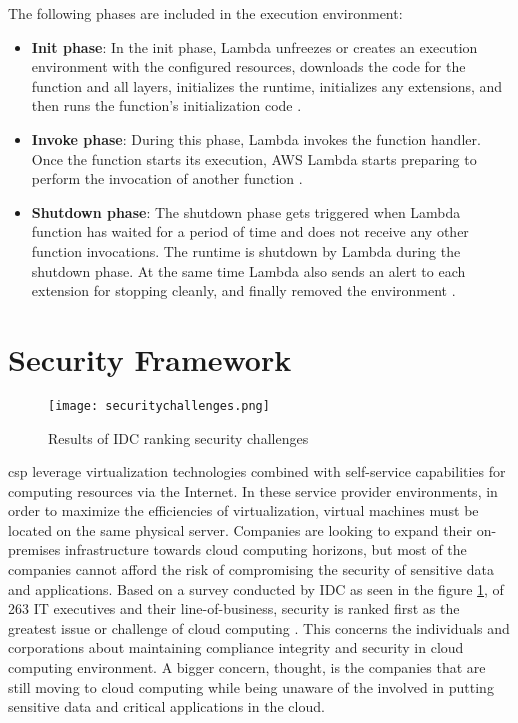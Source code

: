\par The following phases are included in the execution
environment:
\begin{itemize}
    \item \textbf{Init phase}: In the init phase, Lambda unfreezes or creates an execution environment with the configured
    resources, downloads the code for the function and all layers, initializes the runtime, initializes any
    extensions, and then runs the function’s
    initialization code \cite{46}.
\end{itemize}
\begin{itemize}
    \item \textbf{Invoke phase}: During this phase, Lambda invokes the function handler.
    Once the function starts its execution, AWS Lambda
    starts
    preparing to perform the invocation of another
    function \cite{46}.
\end{itemize}
\begin{itemize}
    \item \textbf{Shutdown phase}: The shutdown phase gets
    triggered when Lambda function has waited for a
    period of time and does not receive any
    other function invocations.
    The runtime is shutdown
    by Lambda during the shutdown phase. At the same time
    Lambda also sends an alert to
    each extension for
    stopping cleanly, and finally removed the environment \cite{46}.
\end{itemize}


\section{Security Framework}

\begin{figure}
    \centering
    \texttt{[image: securitychallenges.png]}
    \caption{Results of IDC ranking security
    challenges}{\cite{47}}
    \label{fig:securitychallenges}
\end{figure}

\par \gls{csp} leverage virtualization technologies combined with self-service capabilities for computing resources via the Internet.
In these service provider environments, in order to maximize the efficiencies of virtualization, virtual machines must be located on the same physical server.
Companies are looking to expand their on-premises
infrastructure towards cloud computing horizons, but most
of the companies cannot afford the risk of compromising the
security of sensitive data and applications.
Based on a survey conducted by IDC as seen in the figure \ref{fig:securitychallenges}, of 263 IT executives and their line-of-business, security is ranked first as the greatest issue or challenge of cloud computing \cite{47}.
This concerns the individuals and corporations about maintaining compliance integrity and security in cloud computing environment.
A bigger concern, thought, is the companies that are
still moving to cloud computing while being unaware of the involved in putting sensitive data and critical applications in the cloud.

